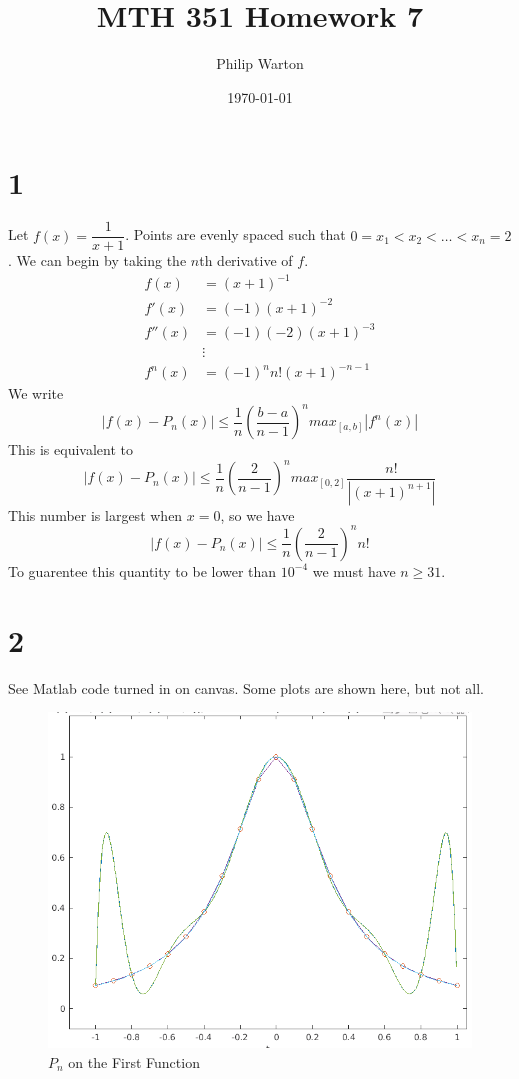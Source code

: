 \documentclass{article}
\begin{document}
\title{MTH 351 Homework 7}
\author{Philip Warton}
\date{\today}
\maketitle
\section*{1}
Let $f(x) = \dfrac{1}{x+1}$. Points are evenly spaced such that $0 = x_1 < x_2 < \dots < x_n = 2$. We can begin by taking the $n$th derivative of $f$.
\begin{align*}
f(x) & = (x+1)^{-1} \\
f'(x) & = (-1)(x+1)^{-2} \\
f''(x) & = (-1)(-2)(x+1)^{-3} \\
&\vdots \\
f^n(x) & = (-1)^nn!(x+1)^{-n-1}
\end{align*}
We write 
\[ |f(x) - P_n(x)| \leqslant \dfrac{1}{n} \left(\dfrac{b-a}{n-1}\right)^n max_{[a,b]}|f^n(x)| \]
This is equivalent to 
\[ |f(x) - P_n(x)| \leqslant \dfrac{1}{n} \left(\dfrac{2}{n-1}\right)^nmax_{[0,2]}\dfrac{n!}{|(x+1)^{n+1}|} \]
This number is largest when $x = 0$, so we have
\[|f(x) - P_n(x)| \leqslant \dfrac{1}{n} \left(\dfrac{2}{n-1}\right)^nn! \]
To guarentee this quantity to be lower than $10^{-4}$ we must have $n \geqslant 31$.

\section*{2}
See Matlab code turned in on canvas. Some plots are shown here, but not all.
\begin{figure}
\caption{$P_n$ on the First Function}
\centering
\includegraphics[scale=.4]{hw_7_plot_g1}
\end{figure}
\end{document}
